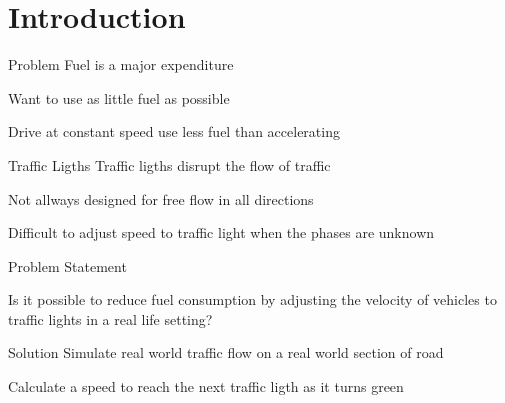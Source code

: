 

\section{Introduction}
\begin{frame}{Problem}
Fuel is a major expenditure

Want to use as little fuel as possible

Drive at constant speed use less fuel than accelerating
\end{frame}

\begin{frame}{Traffic Ligths}
Traffic ligths disrupt the flow of traffic

Not allways designed for free flow in all directions

Difficult to adjust speed to traffic light when the phases are unknown
\end{frame}

\begin{frame}{Problem Statement}
\begin{center}
Is it possible to reduce fuel consumption by adjusting the velocity of vehicles to traffic lights in a real life setting?
\end{center}
\end{frame}

\begin{frame}{Solution}
Simulate real world traffic flow on a real world section of road

Calculate a speed to reach the next traffic ligth as it turns green
\end{frame}

